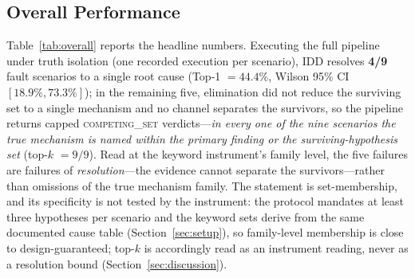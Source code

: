 \documentclass[preprint,10pt]{elsarticle}
\begin{document}
\subsection{Overall Performance}
\label{sec:overall}
Table~\ref{tab:overall} reports the headline numbers. Executing the full pipeline under truth isolation (one recorded execution per scenario), IDD resolves \textbf{4/9} fault scenarios to a single root cause (Top-1 $=44.4\%$, Wilson 95\% CI $[18.9\%,73.3\%]$); in the remaining five, elimination did not reduce the surviving set to a single mechanism and no channel separates the survivors, so the pipeline returns capped \mbox{\textsc{competing\_set}} verdicts---\emph{in every one of the nine scenarios the true mechanism is named within the primary finding or the surviving-hypothesis set} (top-$k$ $=9/9$). Read at the keyword instrument's family level, the five failures are failures of \emph{resolution}---the evidence cannot separate the survivors---rather than omissions of the true mechanism family. The statement is set-membership, and its specificity is not tested by the instrument: the protocol mandates at least three hypotheses per scenario and the keyword sets derive from the same documented cause table (Section~\ref{sec:setup}), so family-level membership is close to design-guaranteed; top-$k$ is accordingly read as an instrument reading, never as a resolution bound (Section~\ref{sec:discussion}).
\end{document}

